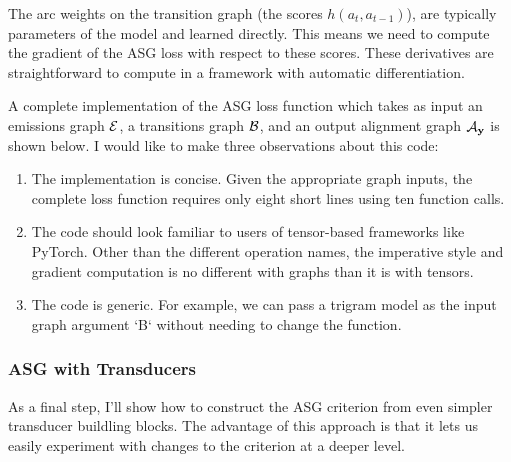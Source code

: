 The arc weights on the transition graph (the scores $h(a_t, a_{t-1})$), are
typically parameters of the model and learned directly. This means we need to
compute the gradient of the ASG loss with respect to these scores. These
derivatives are straightforward to compute in a framework with automatic
differentiation.

A complete implementation of the ASG loss function which takes as input an
emissions graph $\mathcal{E}$, a transitions graph $\mathcal{B}$, and an output alignment graph
$\mathcal{A}_{\bf y}$ is shown below. I would like to make three observations about this
code:

\begin{enumerate}
    \item The implementation is concise. Given the appropriate graph inputs,
        the complete loss function requires only eight short lines using ten
        function calls.

    \item The code should look familiar to users of tensor-based frameworks
        like PyTorch. Other than the different operation names, the imperative
        style and gradient computation is no different with graphs than it is
        with tensors.

    \item The code is generic. For example, we can pass a trigram model as the
        input graph argument `B` without needing to change the function.
\end{enumerate}


%
%
%
%
%

\subsubsection{ASG with Transducers}

As a final step, I'll show how to construct the ASG criterion from even simpler
transducer buildling blocks. The advantage of this approach is that it lets us
easily experiment with changes to the criterion at a deeper level.

